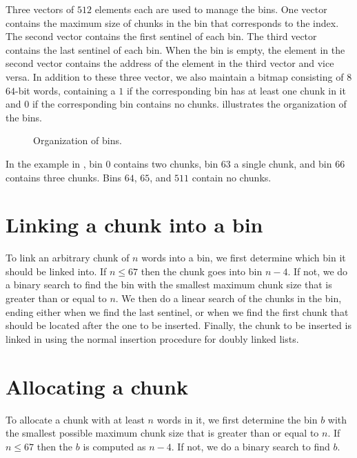 Three vectors of $512$ elements each are used to manage the bins.  One
vector contains the maximum size of chunks in the bin that corresponds
to the index.  The second vector contains the first sentinel of each
bin.  The third vector contains the last sentinel of each bin.  When
the bin is empty, the element in the second vector contains the
address of the element in the third vector and vice versa.  In
addition to these three vector, we also maintain a bitmap consisting
of $8$ $64$-bit words, containing a $1$ if the corresponding bin has
at least one chunk in it and $0$ if the corresponding bin contains no
chunks.   illustrates the organization of the bins.

\begin{figure}
\begin{center}
\end{center}
\caption{\label{fig-bins}
Organization of bins.}
\end{figure}

In the example in , bin $0$ contains two chunks, bin
$63$ a single chunk, and bin $66$ contains three chunks.  Bins $64$,
$65$, and $511$ contain no chunks.

\section{Linking a chunk into a bin}

To link an arbitrary chunk of $n$ words into a bin, we first determine
which bin it should be linked into.  If $n \le 67$ then the chunk goes
into bin $n-4$.  If not, we do a binary search to find the bin with
the smallest maximum chunk size that is greater than or equal to $n$.
We then do a linear search of the chunks in the bin, ending either
when we find the last sentinel, or when we find the first chunk that
should be located after the one to be inserted.  Finally, the chunk to
be inserted is linked in using the normal insertion procedure for
doubly linked lists.

\section{Allocating a chunk}

To allocate a chunk with at least $n$ words in it, we first determine
the bin $b$ with the smallest possible maximum chunk size that is
greater than or equal to $n$.  If $n \le 67$ then the $b$ is computed
as $n-4$.  If not, we do a binary search to find $b$.

